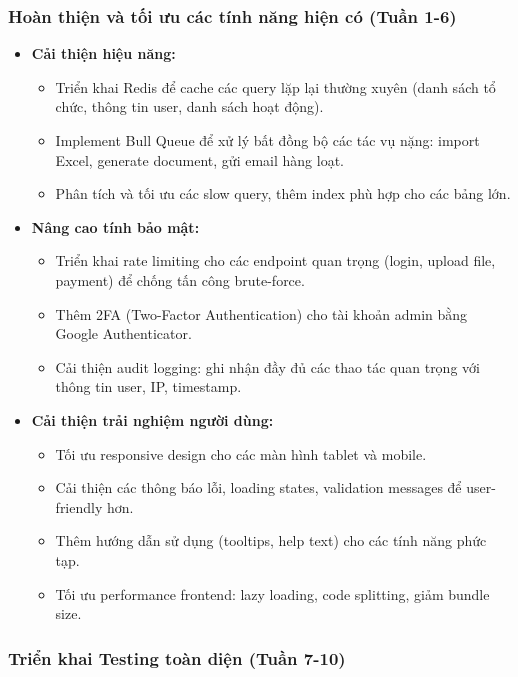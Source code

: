 \subsubsection{Hoàn thiện và tối ưu các tính năng hiện có (Tuần 1-6)}

\begin{itemize}
    \item \textbf{Cải thiện hiệu năng:}
    \begin{itemize}
        \item Triển khai Redis để cache các query lặp lại thường xuyên (danh sách tổ chức, thông tin user, danh sách hoạt động).
        \item Implement Bull Queue để xử lý bất đồng bộ các tác vụ nặng: import Excel, generate document, gửi email hàng loạt.
        \item Phân tích và tối ưu các slow query, thêm index phù hợp cho các bảng lớn.
    \end{itemize}
    
    \item \textbf{Nâng cao tính bảo mật:}
    \begin{itemize}
        \item Triển khai rate limiting cho các endpoint quan trọng (login, upload file, payment) để chống tấn công brute-force.
        \item Thêm 2FA (Two-Factor Authentication) cho tài khoản admin bằng Google Authenticator.
        \item Cải thiện audit logging: ghi nhận đầy đủ các thao tác quan trọng với thông tin user, IP, timestamp.
    \end{itemize}
    
    \item \textbf{Cải thiện trải nghiệm người dùng:}
    \begin{itemize}
        \item Tối ưu responsive design cho các màn hình tablet và mobile.
        \item Cải thiện các thông báo lỗi, loading states, validation messages để user-friendly hơn.
        \item Thêm hướng dẫn sử dụng (tooltips, help text) cho các tính năng phức tạp.
        \item Tối ưu performance frontend: lazy loading, code splitting, giảm bundle size.
    \end{itemize}
\end{itemize}

\subsubsection{Triển khai Testing toàn diện (Tuần 7-10)}

